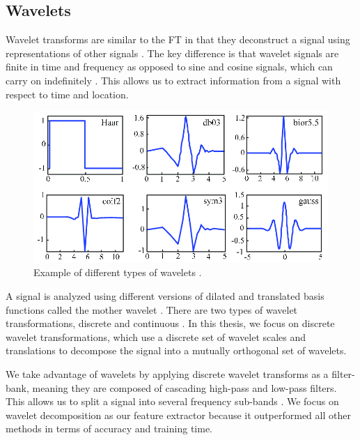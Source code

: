 \documentclass{turabian-thesis}
\begin{document}
\subsection{Wavelets}

Wavelet transforms are similar to the FT in that they deconstruct a signal using representations of other signals \cite{misiti_wavelets_2013}. The key difference is that wavelet signals are finite in time and frequency as opposed to sine and cosine signals, which can carry on indefinitely \cite{strang_wavelets_1996}. This allows us to extract information from a signal with respect to time and location.


\begin{figure}[h!]
   \begin{center}
      \includegraphics[scale=0.4]{../media/wavelet_families.png}
   \end{center}
   \caption{Example of different types of wavelets \cite{lopez_development_2017}.}
   \label{fig:reinforcementAgent}
\end{figure}


A signal is analyzed using different versions of dilated and translated basis functions called the mother wavelet  \cite{strang_wavelets_1996}. There are two types of wavelet transformations, discrete and continuous \cite{imani_curve_2016}. In this thesis, we focus on discrete wavelet transformations, which use a discrete set of wavelet scales and translations to decompose the signal into a mutually orthogonal set of wavelets. 

We take advantage of wavelets by applying discrete wavelet transforms as a filter-bank, meaning they are composed of cascading high-pass and low-pass filters. This allows us to split a signal into several frequency sub-bands  \cite{strang_wavelets_1996}. We focus on wavelet decomposition as our feature extractor because it outperformed all other methods in terms of accuracy and training time.
\end{document}

